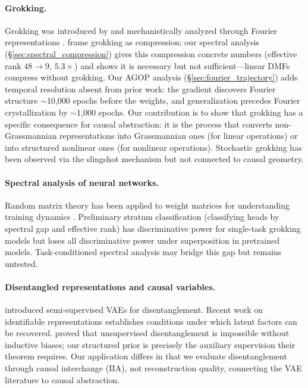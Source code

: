 \documentclass{article}
\begin{document}
\paragraph{Grokking.}
Grokking was introduced by \citet{power2022grokking} and mechanistically
analyzed through Fourier representations \citep{nanda2023progress,
zhong2024clock}. \citet{liu2023grokking} frame grokking as compression;
our spectral analysis (\S\ref{sec:spectral_compression}) gives this
compression concrete numbers (effective rank $48 \to 9$, $5.3\times$) and
shows it is necessary but not sufficient---linear DMFs compress without
grokking. Our AGOP analysis (\S\ref{sec:fourier_trajectory}) adds temporal
resolution absent from prior work: the gradient discovers Fourier structure
$\sim$10{,}000 epochs before the weights, and generalization precedes
Fourier crystallization by $\sim$1{,}000 epochs. Our contribution is to
show that grokking has a specific consequence for causal abstraction: it is
the process that converts non-Grassmannian representations into Grassmannian
ones (for linear operations) or into structured nonlinear ones (for nonlinear
operations). Stochastic grokking has been observed via the slingshot mechanism
\citep{thilak2022slingshot} but not connected to causal geometry.

\paragraph{Spectral analysis of neural networks.}
Random matrix theory has been applied to weight matrices for understanding
training dynamics \citep{martin2021implicit}. Preliminary stratum
classification (classifying heads by spectral gap and effective rank) has
discriminative power for single-task grokking models but loses all
discriminative power under superposition in pretrained models.
Task-conditioned spectral analysis may bridge this gap but remains
untested.

\paragraph{Disentangled representations and causal variables.}
\citet{narayanaswamy2017learning} introduced semi-supervised VAEs for
disentanglement. Recent work on identifiable representations
\citep{khemakhem2020variational} establishes conditions under which latent
factors can be recovered. \citet{locatello2019challenging} proved that
unsupervised disentanglement is impossible without inductive biases; our
structured prior is precisely the auxiliary supervision their theorem
requires. Our application differs in that we evaluate
disentanglement through causal interchange (IIA), not reconstruction quality,
connecting the VAE literature to causal abstraction.
\end{document}
